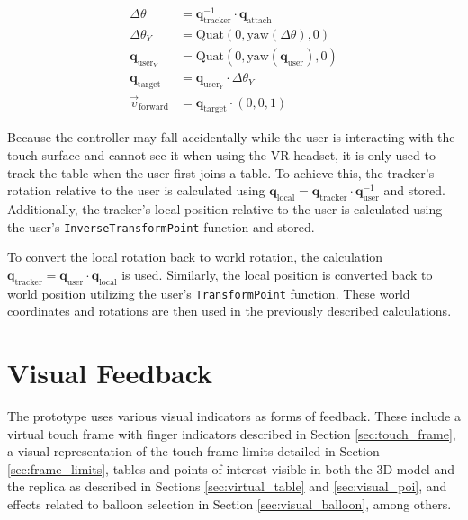     \begin{figure}[h]
    \begin{equation}
    \begin{split} \label{eq:tracker}
        \Delta\theta&=\mathbf{q}_{\mathrm{tracker}}^{-1}\cdot \mathbf{q}_{\mathrm{attach}} \\
        \Delta\theta_Y &= \mathrm{Quat}\left(0, \mathrm{yaw}(\Delta\theta), 0\right) \\
        \mathbf{q}_{\mathrm{user}_Y} &= \mathrm{Quat}(0, \mathrm{yaw}(\mathbf{q}_{\mathrm{user}}), 0) \\
        \mathbf{q}_{\mathrm{target}} &= \mathbf{q}_{\mathrm{user}_Y} \cdot \Delta\theta_Y \\
        \vec{v}_{\mathrm{forward}} &= \mathbf{q}_{\mathrm{target}} \cdot (0,0,1)
    \end{split}
    \end{equation}
    \end{figure}

    Because the controller may fall accidentally while the user is interacting with the touch surface and cannot see it when using the VR headset, it is only used to track the table when the user first joins a table. To achieve this, the tracker's rotation relative to the user is calculated using $\mathbf{q}_{\mathrm{local}} = \mathbf{q}_{\mathrm{tracker}} \cdot \mathbf{q}_{\mathrm{user}}^{-1}$ and stored. Additionally, the tracker's local position relative to the user is calculated using the user's \lstinline{InverseTransformPoint} function and stored.

    To convert the local rotation back to world rotation, the calculation  $\mathbf{q}_{\mathrm{tracker}} = \mathbf{q}_{\mathrm{user}} \cdot \mathbf{q}_{\mathrm{local}}$ is used. Similarly, the local position is converted back to world position utilizing the user's \lstinline{TransformPoint} function. These world coordinates and rotations are then used in the previously described calculations.

\section{Visual Feedback}

    The prototype uses various visual indicators as forms of feedback. These include a virtual touch frame with finger indicators described in Section \ref{sec:touch_frame}, a visual representation of the touch frame limits detailed in Section \ref{sec:frame_limits}, tables and points of interest visible in both the 3D model and the replica as described in Sections \ref{sec:virtual_table} and \ref{sec:visual_poi}, and effects related to balloon selection in Section \ref{sec:visual_balloon}, among others.

